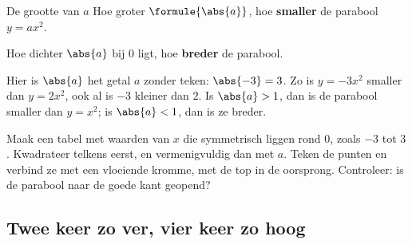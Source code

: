 \begin{theorie}
\begin{stelling}{De grootte van $a$}
Hoe groter $\formule{\abs{a}}$, hoe \textbf{\textcolor{accent}{smaller}} de parabool $y = ax^2$.

Hoe dichter $\abs{a}$ bij $0$ ligt, hoe \textbf{\textcolor{accent}{breder}} de parabool.
\end{stelling}
\end{theorie}

Hier is $\abs{a}$ het getal $a$ zonder teken: $\abs{-3} = 3$. Zo is $y = -3x^2$ smaller dan $y = 2x^2$, ook al is $-3$ kleiner dan $2$. Is $\abs{a} > 1$, dan is de parabool smaller dan $y = x^2$; is $\abs{a} < 1$, dan is ze breder.


\begin{werkwijze}
Maak een tabel met waarden van $x$ die symmetrisch liggen rond $0$, zoals $-3$ tot $3$. Kwadrateer telkens eerst, en vermenigvuldig dan met $a$. Teken de punten en verbind ze met een vloeiende kromme, met de top in de oorsprong. Controleer: is de parabool naar de goede kant geopend?
\end{werkwijze}

\begin{oefeningen}
\end{oefeningen}

\subsection{Twee keer zo ver, vier keer zo hoog}

